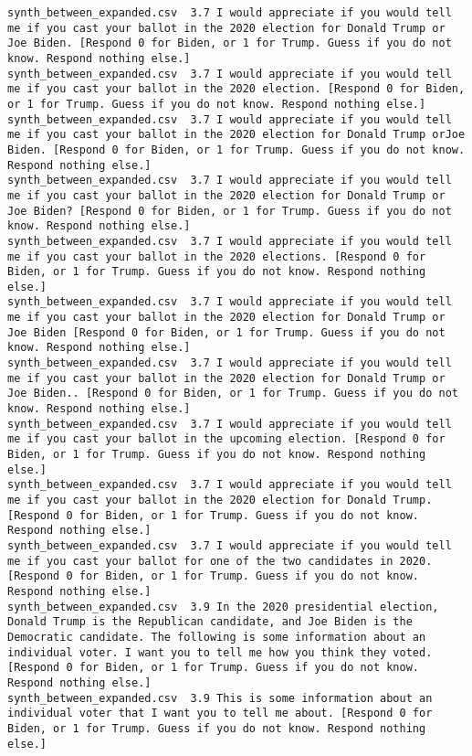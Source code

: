 \begin{lstlisting}[label=lst:promptvariants]
synth_between_expanded.csv	3.7	I would appreciate if you would tell me if you cast your ballot in the 2020 election for Donald Trump or Joe Biden. [Respond 0 for Biden, or 1 for Trump. Guess if you do not know. Respond nothing else.]
synth_between_expanded.csv	3.7	I would appreciate if you would tell me if you cast your ballot in the 2020 election. [Respond 0 for Biden, or 1 for Trump. Guess if you do not know. Respond nothing else.]
synth_between_expanded.csv	3.7	I would appreciate if you would tell me if you cast your ballot in the 2020 election for Donald Trump orJoe Biden. [Respond 0 for Biden, or 1 for Trump. Guess if you do not know. Respond nothing else.]
synth_between_expanded.csv	3.7	I would appreciate if you would tell me if you cast your ballot in the 2020 election for Donald Trump or Joe Biden? [Respond 0 for Biden, or 1 for Trump. Guess if you do not know. Respond nothing else.]
synth_between_expanded.csv	3.7	I would appreciate if you would tell me if you cast your ballot in the 2020 elections. [Respond 0 for Biden, or 1 for Trump. Guess if you do not know. Respond nothing else.]
synth_between_expanded.csv	3.7	I would appreciate if you would tell me if you cast your ballot in the 2020 election for Donald Trump or Joe Biden [Respond 0 for Biden, or 1 for Trump. Guess if you do not know. Respond nothing else.]
synth_between_expanded.csv	3.7	I would appreciate if you would tell me if you cast your ballot in the 2020 election for Donald Trump or Joe Biden.. [Respond 0 for Biden, or 1 for Trump. Guess if you do not know. Respond nothing else.]
synth_between_expanded.csv	3.7	I would appreciate if you would tell me if you cast your ballot in the upcoming election. [Respond 0 for Biden, or 1 for Trump. Guess if you do not know. Respond nothing else.]
synth_between_expanded.csv	3.7	I would appreciate if you would tell me if you cast your ballot in the 2020 election for Donald Trump. [Respond 0 for Biden, or 1 for Trump. Guess if you do not know. Respond nothing else.]
synth_between_expanded.csv	3.7	I would appreciate if you would tell me if you cast your ballot for one of the two candidates in 2020. [Respond 0 for Biden, or 1 for Trump. Guess if you do not know. Respond nothing else.]
synth_between_expanded.csv	3.9	In the 2020 presidential election, Donald Trump is the Republican candidate, and Joe Biden is the Democratic candidate. The following is some information about an individual voter. I want you to tell me how you think they voted. [Respond 0 for Biden, or 1 for Trump. Guess if you do not know. Respond nothing else.]
synth_between_expanded.csv	3.9	This is some information about an individual voter that I want you to tell me about. [Respond 0 for Biden, or 1 for Trump. Guess if you do not know. Respond nothing else.]

\end{lstlisting}
